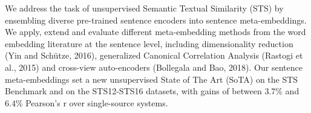 We address the task of unsupervised Semantic Textual Similarity (STS) by ensembling diverse pre-trained sentence encoders into sentence meta-embeddings. We apply, extend and evaluate different meta-embedding methods from the word embedding literature at the sentence level, including dimensionality reduction (Yin and Schütze, 2016), generalized Canonical Correlation Analysis (Rastogi et al., 2015) and cross-view auto-encoders (Bollegala and Bao, 2018). Our sentence meta-embeddings set a new unsupervised State of The Art (SoTA) on the STS Benchmark and on the STS12-STS16 datasets, with gains of between 3.7\% and 6.4\% Pearson's r over single-source systems.
